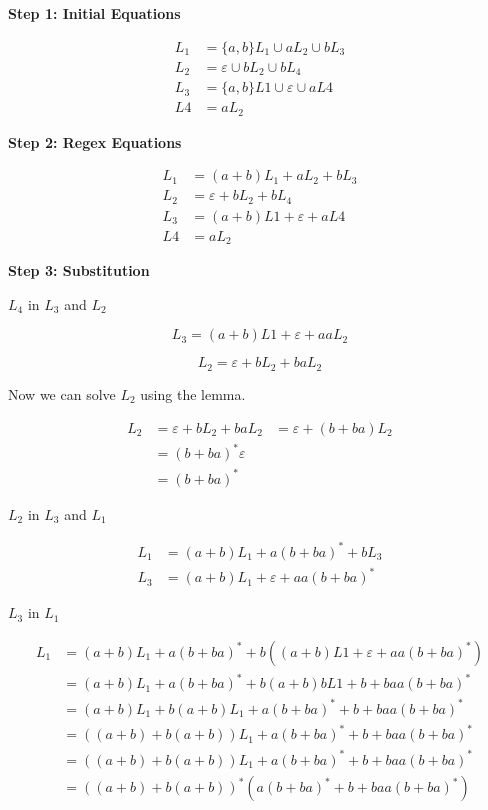 \textbf{Step 1: Initial Equations}

\begin{align*}
    L_1 &= \{a,b\}L_1 \cup aL_2 \cup bL_3\\
    L_2 &= \varepsilon \cup bL_2 \cup b L_4 \\
    L_3 &= \{a,b\}L1 \cup \varepsilon \cup aL4 \\
    L4  &= aL_2
\end{align*}

\textbf{Step 2: Regex Equations}

\begin{align*}
L_1 &= (a+b)L_1 + aL_2 +bL_3\\
L_2 &= \varepsilon + bL_2 + b L_4 \\
L_3 &= (a+b)L1 + \varepsilon + aL4 \\
L4  &= aL_2
\end{align*}

\textbf{Step 3: Substitution}

\(L_4\) in \(L_3\) and \(L_2\)

\[
    L_3 = (a+b)L1 + \varepsilon + aaL_2
\]

\[
    L_2 = \varepsilon + bL_2 + baL_2
\]

Now we can solve \(L_2\) using the lemma.

\begin{align*}
    L_2 &= \varepsilon + bL_2 + baL_2
        &= \varepsilon + (b + ba)L_2 \\
        &= (b + ba)^*\varepsilon \\
        &= (b + ba)^*
\end{align*}

\(L_2\) in \(L_3\) and \(L_1\) 

\begin{align*}
    L_1 &= (a+b)L_1 + a(b + ba)^* +bL_3\\
    L_3 &= (a+b)L_1 + \varepsilon + aa(b + ba)^* 
\end{align*}

\(L_3\) in  \(L_1\)

\begin{align*}
    L_1 &= (a+b)L_1 + a(b + ba)^* +b((a+b)L1 + \varepsilon + aa(b + ba)^*)\\
        &= (a+b)L_1 + a(b + ba)^* +b(a+b)bL1 + b + baa(b + ba)^*\\
        &= (a+b)L_1  + b(a+b)L_1 + a(b + ba)^* + b + baa(b + ba)^*\\
        &= ((a+b)  + b(a+b))L_1 + a(b + ba)^* + b + baa(b + ba)^*\\
        &= ((a+b)  + b(a+b))L_1 + a(b + ba)^* + b + baa(b + ba)^*\\
        &= ((a+b)  + b(a+b))^*(a(b + ba)^* + b + baa(b + ba)^*)
\end{align*}

